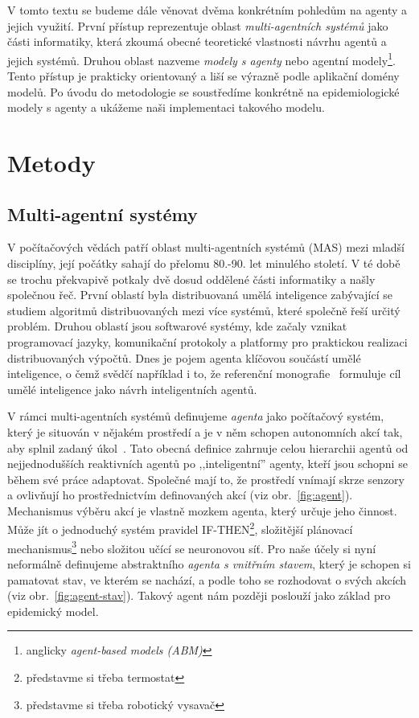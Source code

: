 V tomto textu se budeme dále věnovat dvěma konkrétním pohledům na agenty a jejich využití. První přístup reprezentuje oblast \emph{multi-agentních systémů} jako části informatiky, která zkoumá obecné teoretické vlastnosti návrhu agentů a jejich systémů. Druhou oblast nazveme \emph{modely s agenty} nebo agentní modely\footnote{anglicky \emph{agent-based models (ABM)}}. Tento přístup je prakticky orientovaný a liší se výrazně podle aplikační domény modelů. Po úvodu do metodologie se soustředíme konkrétně na epidemiologické modely s agenty a ukážeme naši implementaci takového modelu.

\section*{Metody} 

\subsection*{Multi-agentní systémy}

V počítačových vědách patří oblast multi-agentních systémů (MAS) mezi mladší disciplíny, její počátky sahají do přelomu 80.-90. let minulého století. V té době se trochu překvapivě potkaly dvě dosud oddělené části informatiky a našly společnou řeč. První oblastí byla distribuovaná umělá inteligence zabývající se studiem algoritmů distribuovaných mezi více systémů, které společně řeší určitý problém. Druhou oblastí jsou softwarové systémy, kde začaly vznikat programovací jazyky, komunikační protokoly a platformy pro praktickou realizaci distribuovaných výpočtů. Dnes je pojem agenta klíčovou součástí umělé inteligence, o čemž svědčí například i to, že referenční monografie~\cite{AIMA20} formuluje cíl umělé inteligence jako návrh inteligentních agentů. 

V rámci multi-agentních systémů definujeme \emph{agenta} jako počítačový systém, který je situován v nějakém prostředí a je v něm schopen autonomních akcí tak, aby splnil zadaný úkol~\cite{Wooldridge09}. Tato obecná definice zahrnuje celou hierarchii agentů od nejjednodušších reaktivních agentů po ,,inteligentní'' agenty, kteří jsou schopni se během své práce adaptovat. Společné mají to, že prostředí vnímají skrze senzory a ovlivňují ho prostřednictvím definovaných akcí (viz obr.~\ref{fig:agent}). Mechanismus výběru akcí je vlastně mozkem agenta, který určuje jeho činnost. Může jít o jednoduchý systém pravidel IF-THEN\footnote{představme si třeba termostat}, složitější plánovací mechanismus\footnote{představme si třeba robotický vysavač} nebo složitou učící se neuronovou síť. Pro naše účely si nyní neformálně definujeme abstraktního \emph{agenta s vnitřním stavem}, který je schopen si pamatovat stav, ve kterém se nachází, a podle toho se rozhodovat o svých akcích (viz obr.~\ref{fig:agent-stav}). Takový agent nám později poslouží jako základ pro epidemický model.  

